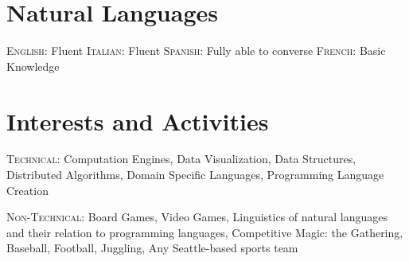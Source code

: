 \documentclass[letterpaper,10pt]{article} %
\begin{document}






\section{Natural Languages}

\textsc{English:} Fluent \hfill \textsc{Italian:} Fluent \hfill 
\textsc{Spanish:} Fully able to converse \hfill \textsc{French:} Basic Knowledge




\section{Interests and Activities}

\textsc{Technical:} Computation Engines, Data Visualization, Data Structures, Distributed Algorithms, Domain Specific Languages, Programming Language Creation

\textsc{Non-Technical:} Board Games, Video Games, Linguistics of natural languages and their relation to programming languages, Competitive Magic: the Gathering, 
Baseball, Football, Juggling, Any Seattle-based sports team

\end{document}
